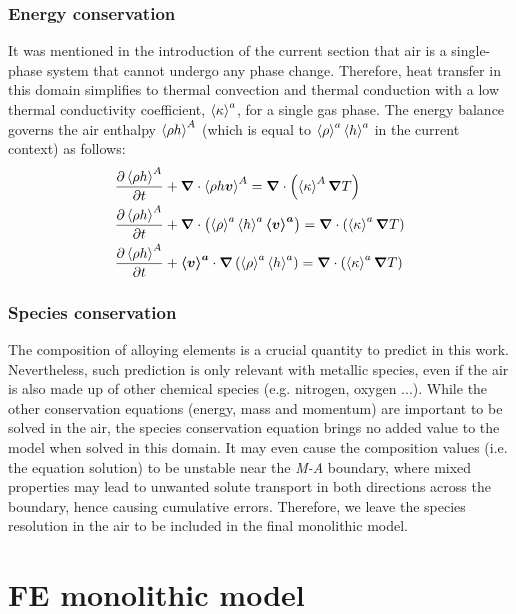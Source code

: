 
\subsubsection{Energy conservation}

It was mentioned in the introduction of the current section that air is a single-phase system
that cannot undergo any phase change. Therefore, heat transfer in this domain simplifies to thermal convection
and thermal conduction with a low thermal conductivity coefficient, $\left \langle \kappa \right \rangle^a$, for a single gas phase.
The energy balance governs the air enthalpy $\left \langle \rho h \right \rangle^A$ (which is equal to $\left \langle \rho \right \rangle^a \left \langle h \right \rangle^a$ 
in the current context) as follows:
\begin{subequations}
\begin{align}
	& \frac{\partial \left \langle \rho h \right \rangle^A}{\partial t}  + \boldsymbol{\nabla} \cdot \left \langle \rho h \boldsymbol{v} \right \rangle^A 
	= \boldsymbol{\nabla}  \cdot \left( \left \langle \kappa \right \rangle^A \boldsymbol{\nabla} T  \right) \\
	& \frac{\partial \left \langle \rho h \right \rangle^A}{\partial t}  + \boldsymbol{\nabla} \cdot \left(  \left \langle \rho \right \rangle^a \left \langle h \right \rangle^a \boldsymbol{\left \langle v \right \rangle^a} \right) 
	= \boldsymbol{\nabla}  \cdot \left( \left \langle \kappa \right \rangle^a\boldsymbol{\nabla} T  \right) \\
	\label{eq:energy_balance_air}
	& \frac{\partial \left \langle \rho h \right \rangle^A}{\partial t} 
		+ \boldsymbol{\left \langle v \right \rangle^a} \cdot \boldsymbol{\nabla} \left( \left \langle \rho \right \rangle^a \left \langle h \right \rangle^a \right)
		= \boldsymbol{\nabla}  \cdot \left( \left \langle \kappa \right \rangle^a\boldsymbol{\nabla} T  \right)
\end{align}
\end{subequations}

\subsubsection{Species conservation} \label{sec:solute_air}
The composition of alloying elements is a crucial quantity to predict in this work. 
Nevertheless, such prediction is only relevant with metallic species, even if the air 
is also made up of other chemical species (e.g. nitrogen, oxygen ...). 
While the other conservation equations (energy, mass and momentum) are important to be solved in the air, 
the species conservation equation brings no added value to the model when solved in this domain. 
It may even cause the composition values (i.e. the equation solution) to be unstable near the \emph{M-A} boundary, where mixed properties
may lead to unwanted solute transport in both directions across the boundary, hence causing cumulative errors.
Therefore, we leave the species resolution in the air to be included in the final monolithic model.

\section{FE monolithic model}

